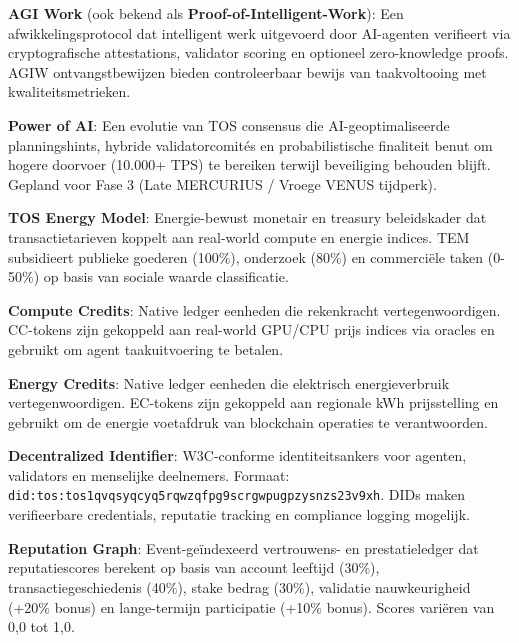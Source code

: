 \documentclass[11pt]{article}
\begin{document}
\begin{description}[leftmargin=3cm, style=nextline]
  \item[AGIW (PoIW)] \textbf{AGI Work} (ook bekend als \textbf{Proof-of-Intelligent-Work}): Een afwikkelingsprotocol dat intelligent werk uitgevoerd door AI-agenten verifieert via cryptografische attestations, validator scoring en optioneel zero-knowledge proofs. AGIW ontvangstbewijzen bieden controleerbaar bewijs van taakvoltooing met kwaliteitsmetrieken.

  \item[PAI] \textbf{Power of AI}: Een evolutie van TOS consensus die AI-geoptimaliseerde planningshints, hybride validatorcomités en probabilistische finaliteit benut om hogere doorvoer (10.000+ TPS) te bereiken terwijl beveiliging behouden blijft. Gepland voor Fase 3 (Late MERCURIUS / Vroege VENUS tijdperk).

  \item[TEM] \textbf{TOS Energy Model}: Energie-bewust monetair en treasury beleidskader dat transactietarieven koppelt aan real-world compute en energie indices. TEM subsidieert publieke goederen (100\%), onderzoek (80\%) en commerciële taken (0-50\%) op basis van sociale waarde classificatie.

  \item[CC] \textbf{Compute Credits}: Native ledger eenheden die rekenkracht vertegenwoordigen. CC-tokens zijn gekoppeld aan real-world GPU/CPU prijs indices via oracles en gebruikt om agent taakuitvoering te betalen.

  \item[EC] \textbf{Energy Credits}: Native ledger eenheden die elektrisch energieverbruik vertegenwoordigen. EC-tokens zijn gekoppeld aan regionale kWh prijsstelling en gebruikt om de energie voetafdruk van blockchain operaties te verantwoorden.

  \item[DID] \textbf{Decentralized Identifier}: W3C-conforme identiteitsankers voor agenten, validators en menselijke deelnemers. Formaat: \texttt{did:tos:tos1qvqsyqcyq5rqwzqfpg9scrgwpugpzysnzs23v9xh}. DIDs maken verifieerbare credentials, reputatie tracking en compliance logging mogelijk.

  \item[RepGraph] \textbf{Reputation Graph}: Event-geïndexeerd vertrouwens- en prestatieledger dat reputatiescores berekent op basis van account leeftijd (30\%), transactiegeschiedenis (40\%), stake bedrag (30\%), validatie nauwkeurigheid (+20\% bonus) en lange-termijn participatie (+10\% bonus). Scores variëren van 0,0 tot 1,0.


\end{description}
\end{document}
